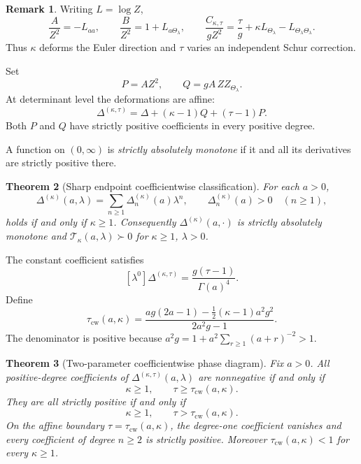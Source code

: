 \documentclass[11pt,a4paper]{amsart}
\numberwithin{equation}{section}
\theoremstyle{plain}
\newtheorem{theorem}{Theorem}[section]
\theoremstyle{definition}
\newtheorem{remark}[theorem]{Remark}
\newcommand{\Turan}{\mathcal T}
\newcommand{\Thetal}{\Theta_{\lambda}}
\begin{document}
\begin{remark}\label{rem:canonical-origin}
Writing \(L=\log Z\),
\[
 \frac{A}{Z^2}=-L_{aa},\qquad
 \frac{B}{Z^2}=1+L_{a\Thetal},\qquad
 \frac{C_{\kappa,\tau}}{gZ^2}
 =\frac\tau g+\kappa L_{\Thetal}-L_{\Thetal\Thetal}.
\]
Thus \(\kappa\) deforms the Euler direction and \(\tau\) varies an independent
Schur correction.
\end{remark}

Set
\begin{equation}\label{eq:PQdef}
 P=AZ^2,\qquad Q=gA\,ZZ_{\Thetal}.
\end{equation}
At determinant level the deformations are affine:
\begin{equation}\label{eq:affine-two-param}
 \Delta^{(\kappa,\tau)}
 =\Delta+(\kappa-1)Q+(\tau-1)P.
\end{equation}
Both \(P\) and \(Q\) have strictly positive coefficients in every positive
degree.

A function on \((0,\infty)\) is \emph{strictly absolutely monotone} if it and
all its derivatives are strictly positive there.

\begin{theorem}[Sharp endpoint coefficientwise classification]\label{thm:coefficientwise}
For each \(a>0\),
\[
 \Delta^{(\kappa)}(a,\lambda)
 =\sum_{n\ge1}\Delta_n^{(\kappa)}(a)\lambda^n,
 \qquad
 \Delta_n^{(\kappa)}(a)>0\quad(n\ge1),
\]
holds if and only if \(\kappa\ge1\).  Consequently
\(\Delta^{(\kappa)}(a,\cdot)\) is strictly absolutely monotone and
\(\Turan_\kappa(a,\lambda)\succ0\) for \(\kappa\ge1\), \(\lambda>0\).
\end{theorem}

The constant coefficient satisfies
\begin{equation}\label{eq:Delta0-tau}
 [\lambda^0]\Delta^{(\kappa,\tau)}
 =\frac{g(\tau-1)}{\Gamma(a)^4}.
\end{equation}
Define
\begin{equation}\label{eq:tau-cw}
 \tau_{\mathrm{cw}}(a,\kappa)
 =\frac{ag(2a-1)-\frac12(\kappa-1)a^2g^2}{2a^2g-1}.
\end{equation}
The denominator is positive because
\(a^2g=1+a^2\sum_{r\ge1}(a+r)^{-2}>1\).

\begin{theorem}[Two-parameter coefficientwise phase diagram]\label{thm:two-parameter-coeff}
Fix \(a>0\).  All positive-degree coefficients of
\(\Delta^{(\kappa,\tau)}(a,\lambda)\) are nonnegative if and only if
\[
 \kappa\ge1,\qquad \tau\ge\tau_{\mathrm{cw}}(a,\kappa).
\]
They are all strictly positive if and only if
\[
 \kappa\ge1,\qquad \tau>\tau_{\mathrm{cw}}(a,\kappa).
\]
On the affine boundary \(\tau=\tau_{\mathrm{cw}}(a,\kappa)\), the degree-one
coefficient vanishes and every coefficient of degree \(n\ge2\) is strictly
positive.  Moreover \(\tau_{\mathrm{cw}}(a,\kappa)<1\) for every \(\kappa\ge1\).
\end{theorem}
\end{document}
